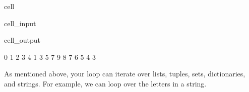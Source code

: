 \documentclass[letterpaper,10pt,english]{jupyterBook}
\begin{document}
\begin{sphinxuseclass}{cell}\begin{sphinxVerbatimInput}

\begin{sphinxuseclass}{cell_input}
\begin{sphinxVerbatim}[commandchars=\\\{\}]
     

     

     
\end{sphinxVerbatim}

\end{sphinxuseclass}\end{sphinxVerbatimInput}
\begin{sphinxVerbatimOutput}

\begin{sphinxuseclass}{cell_output}
\begin{sphinxVerbatim}[commandchars=\\\{\}]
0
1
2
3
4
\PYGZhy{}\PYGZhy{}\PYGZhy{}
1
3
5
7
\PYGZhy{}\PYGZhy{}\PYGZhy{}
9
8
7
6
5
4
3
\end{sphinxVerbatim}

\end{sphinxuseclass}\end{sphinxVerbatimOutput}

\end{sphinxuseclass}
\sphinxAtStartPar
As mentioned above, your  loop can iterate over lists, tuples, sets, dictionaries, and strings. For example, we can loop over the letters in a string.
\end{document}
